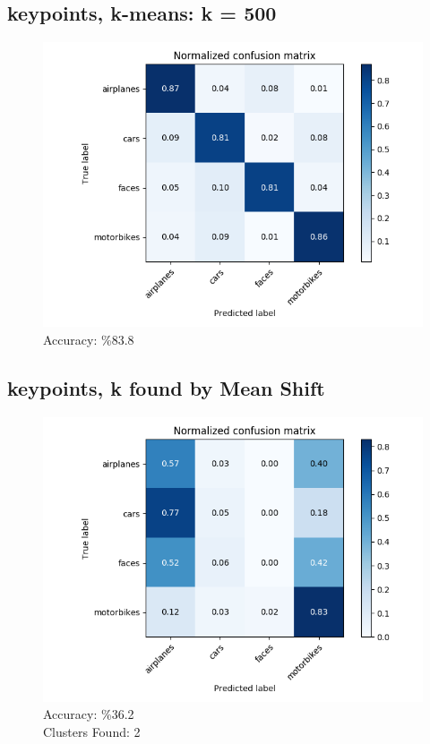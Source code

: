 \subsection*{keypoints, k-means: k = 500}
\begin{figure}[H]
    \centering
    \includegraphics[scale = 0.45]{images/confusion-kp-500.png}
    \caption*{Accuracy: \%83.8}
\end{figure}

\subsection*{keypoints, k found by Mean Shift}
\begin{figure}[H]
    \centering
    \includegraphics[scale = 0.45]{images/confusion-kp-meanshift.png}
    \caption*{Accuracy: \%36.2 \\
              Clusters Found: 2}
\end{figure}

